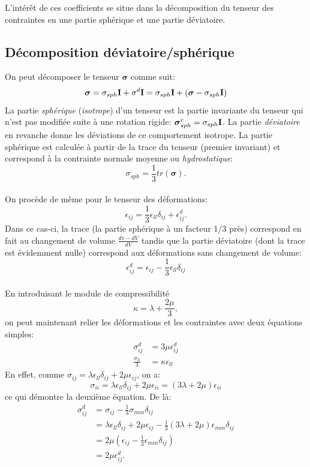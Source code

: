 L'intérêt de ces coefficients se situe dans la décomposition du tenseur des contraintes en une partie sphérique et une partie déviatoire.

\subsection{Décomposition déviatoire/sphérique}
On peut décomposer le tenseur $\boldsymbol{\sigma}$ comme suit:
$$\boldsymbol{\sigma}=\sigma_{sph}\textbf{I}+\sigma^d\textbf{I}=\sigma_{sph}\textbf{I}+(\boldsymbol{\sigma}-\sigma_{sph}\textbf{I})$$
La partie \emph{sphérique} (\emph{isotrope}) d'un tenseur est la partie invariante du tenseur qui n'est pas modifiée suite à une rotation rigide: $\boldsymbol{\sigma}_{sph}^r=\sigma_{sph}\textbf{I}$. La partie \emph{déviatoire} en revanche donne les déviations de ce comportement isotrope.
La partie sphérique est calculée à partir de la trace du tenseur (premier invariant) et correspond à la contrainte normale moyenne ou \emph{hydrostatique}:
$$\sigma_{sph}=\frac{1}{3}tr(\boldsymbol{\sigma}).$$
\paragraph{}
On procède de même pour le tenseur des déformations:
$$\epsilon_{ij}=\frac{1}{3}\epsilon_{ll}\delta_{ij}+\epsilon_{ij}^d.$$ Dans ce cas-ci, la trace (la partie sphérique à un facteur 1/3 près) correspond en fait au changement de volume $\frac{dv-dV}{dV}$ tandis que la partie déviatoire (dont la trace est évidemment nulle) correspond aux déformations sans changement de volume:
$$\epsilon_{ij}^d=\epsilon_{ij}-\frac{1}{3}\epsilon_{ll}\delta_{ij}$$
\paragraph{}
En introduisant le module de compressibilité $$\kappa=\lambda+\frac{2\mu}{3},$$ on peut maintenant relier les déformations et les contraintes avec deux équations simples:
\begin{align}
\label{defo-cont}
\sigma_{ij}^d&=3\mu\epsilon_{ij}^d\\
\frac{\sigma_{ll}}{3}&=\kappa\epsilon_{ll}
\end{align}
En effet, comme $\sigma_{ij}=\lambda\epsilon_{ll}\delta_{ij}+2\mu\epsilon_{ij}$, on a:
$$\sigma_{ii}=\lambda\epsilon_{ll}\delta_{ij}+2\mu\epsilon_{ii}=(3\lambda+2\mu)\epsilon_{ii}$$ ce qui démontre la deuxième équation. De là:
\begin{align*}
\sigma_{ij}^d&=\sigma_{ij}-\frac{1}{3}\sigma_{mm}\delta_{ij}\\
 &=\lambda\epsilon_{ll}\delta_{ij}+2\mu\epsilon_{ij}-\frac{1}{3}(3\lambda+2\mu)\epsilon_{mm}\delta_{ij}\\
 &=2\mu(\epsilon_{ij}-\frac{1}{3}\epsilon_{mm}\delta_{ij})\\
 &=2\mu\epsilon_{ij}^d.\\
\end{align*}

